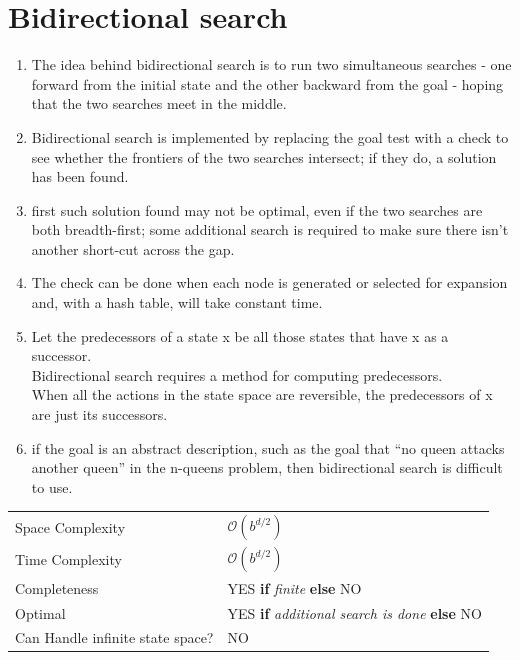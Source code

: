 \section{Bidirectional search \cite{aci-1}} \label{Bidirectional search}

\begin{enumerate}
    \item The idea behind bidirectional search is to run two simultaneous searches - one forward from the initial state and the other backward from the goal - hoping that the two searches meet in the middle.

    \item Bidirectional search is implemented by replacing the goal test with a check to see whether the frontiers of the two searches intersect; if they do, a solution has been found.

    \item first such solution found may not be optimal, even if the two searches are both breadth-first; some additional search is required to make sure there isn’t another short-cut across the gap.

    \item The check can be done when each node is generated or selected for expansion and, with a hash table, will take constant time.

    \item Let the predecessors of a state x be all those states that have x as a successor.\\
    Bidirectional search requires a method for computing predecessors.\\
    When all the actions in the state space are reversible, the predecessors of x are just its successors.

    \item  if the goal is an abstract description, such as the goal that “no queen attacks another queen” in the n-queens problem, then bidirectional search is difficult to use.
\end{enumerate}

\begin{customTableWrapper}{1.2}
\begin{longtable}{p{3cm} p{6cm}}
    Space Complexity & $\mathcal{O}(b^{d/2})$ \\

    Time Complexity & $\mathcal{O}(b^{d/2})$ \\

    \hline

    Completeness & YES \textbf{if} \textit{finite} \textbf{else} NO \\

    Optimal & YES \textbf{if} \textit{additional search is done} \textbf{else} NO \\

    Can Handle infinite state space? & NO \\
\end{longtable}
\end{customTableWrapper}



